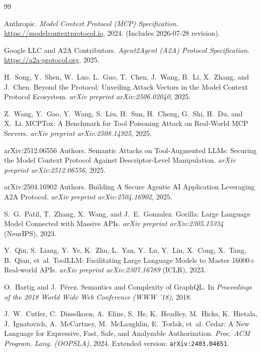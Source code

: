 \documentclass[10pt,twocolumn]{article}
\begin{document}
\begin{thebibliography}{99}

{Anthropic}.
\newblock \emph{Model Context Protocol (MCP) Specification}.
\newblock \url{https://modelcontextprotocol.io}, 2024. (Includes 2026-07-28 revision).

{Google LLC and A2A Contributors}.
\newblock \emph{Agent2Agent (A2A) Protocol Specification}.
\newblock \url{https://a2a-protocol.org}, 2025.

H.~Song, Y.~Shen, W.~Luo, L.~Guo, T.~Chen, J.~Wang, B.~Li, X.~Zhang, and J.~Chen.
\newblock Beyond the Protocol: Unveiling Attack Vectors in the Model Context Protocol Ecosystem.
\newblock \emph{arXiv preprint arXiv:2506.02040}, 2025.

Z.~Wang, Y.~Gao, Y.~Wang, S.~Liu, H.~Sun, H.~Cheng, G.~Shi, H.~Du, and X.~Li.
\newblock MCPTox: A Benchmark for Tool Poisoning Attack on Real-World MCP Servers.
\newblock \emph{arXiv preprint arXiv:2508.14925}, 2025.

{arXiv:2512.06556 Authors}.
\newblock Semantic Attacks on Tool-Augmented LLMs: Securing the Model Context Protocol Against Descriptor-Level Manipulation.
\newblock \emph{arXiv preprint arXiv:2512.06556}, 2025.

{arXiv:2504.16902 Authors}.
\newblock Building A Secure Agentic AI Application Leveraging A2A Protocol.
\newblock \emph{arXiv preprint arXiv:2504.16902}, 2025.

S.~G.~Patil, T.~Zhang, X.~Wang, and J.~E.~Gonzalez.
\newblock Gorilla: Large Language Model Connected with Massive APIs.
\newblock \emph{arXiv preprint arXiv:2305.15334} (NeurIPS), 2023.

Y.~Qin, S.~Liang, Y.~Ye, K.~Zhu, L.~Yan, Y.~Lu, Y.~Lin, X.~Cong, X.~Tang, B.~Qian, et~al.
\newblock ToolLLM: Facilitating Large Language Models to Master 16000+ Real-world APIs.
\newblock \emph{arXiv preprint arXiv:2307.16789} (ICLR), 2023.

O.~Hartig and J.~P\'erez.
\newblock Semantics and Complexity of GraphQL.
\newblock In \emph{Proceedings of the 2018 World Wide Web Conference (WWW '18)}, 2018.

J.~W.~Cutler, C.~Disselkoen, A.~Eline, S.~He, K.~Headley, M.~Hicks, K.~Hietala, J.~Ignatovich, A.~McCartney, M.~McLaughlin, E.~Torlak, et~al.
\newblock Cedar: A New Language for Expressive, Fast, Safe, and Analyzable Authorization.
\newblock \emph{Proc. ACM Program. Lang. (OOPSLA)}, 2024. Extended version: \texttt{arXiv:2403.04651}.


\end{thebibliography}
\end{document}
